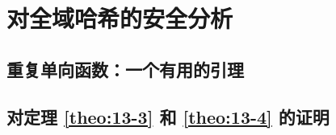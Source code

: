 \section{对全域哈希的安全分析}\label{sec:13-4}

\subsection{重复单向函数：一个有用的引理}\label{subsec:13-4-1}

\begin{game}[$t$ 次重复单向问题]\label{game:13-3}
	
\end{game}

\begin{lemma}\label{lemma:13-5}
	
\end{lemma}

\begin{game}\label{game:13-4}
	
\end{game}

\begin{lemma}\label{lemma:13-6}
	
\end{lemma}

\subsection{对定理 \ref{theo:13-3} 和 \ref{theo:13-4} 的证明}\label{subsec:13-4-2}
